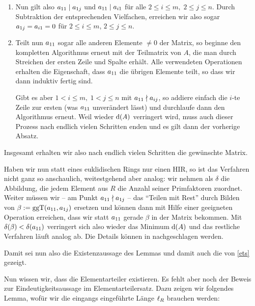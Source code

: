 \begin{proofsketch}
\begin{enumerate}[1.]
        \item
            Nun gilt also $a_{11} \mid a_{1j}$ und $a_{11} \mid a_{i1}$ für alle
            $2\leq i\leq m,\; 2\leq j\leq n$. Durch Subtraktion der entsprechenden
            Vielfachen, erreichen wir also sogar $a_{1j} = a_{i1} = 0$ für
            $2\leq i\leq m$, $2\leq j\leq n$.
            
        \item
            Teilt nun $a_{11}$ sogar alle anderen Elemente $\neq 0$ der Matrix, so
            beginne den kompletten Algorithmus erneut mit der Teilmatrix von
            $A$, die man durch Streichen der ersten Zeile und Spalte erhält.
            Alle verwendeten Operationen erhalten die Eigenschaft, dass $a_{11}$
            die übrigen Elemente teilt, so dass wir dann induktiv fertig sind.
            
            Gibt es aber $1<i\leq m,\; 1<j\leq n$ mit $a_{11} \nmid a_{ij}$, so
            addiere einfach die $i$-te Zeile zur ersten (was $a_{11}$ unverändert
            lässt) und durchlaufe dann den Algorithmus erneut. Weil wieder
            $\mathrm{d}(A)$ verringert wird, muss auch dieser Prozess nach endlich
            vielen Schritten enden und es gilt dann der vorherige Absatz.
    \end{enumerate}
    Insgesamt erhalten wir also nach endlich vielen Schritten die gewünschte
    Matrix.
    
    Haben wir nun statt eines euklidischen Rings nur einen HIR, so ist das
    Verfahren nicht ganz so anschaulich, weitestgehend aber analog: wir nehmen
    als $\delta$ die Abbildung, die jedem Element aus $R$ die Anzahl seiner
    Primfaktoren zuordnet. Weiter müssen wir -- am Punkt $a_{11} \nmid a_{1j}$ --
    das \enquote{Teilen mit Rest} durch Bilden von 
    $\beta := \mathrm{ggT}(a_{11},a_{1j})$ ersetzen und können dann mit Hilfe einer
    geeigneten Operation erreichen, dass wir statt $a_{11}$ gerade $\beta$ in
    der Matrix bekommen. Mit $\delta(\beta) < \delta(a_{11})$ verringert sich also
    wieder das Minimum $\mathrm{d}(A)$ und das restliche Verfahren läuft analog ab. Die
    Details können in \cite[S.\,213\,f.]{bookc:bosch08} nachgeschlagen werden.
    
    Damit sei nun also die Existenzaussage des Lemmas und damit auch die von
    \cref{ets} gezeigt.
    \\
\end{proofsketch}

Nun wissen wir, dass die Elementarteiler existieren. Es fehlt aber noch der
Beweis zur Eindeutigkeitsaussage im Elementarteilersatz. Dazu zeigen wir
folgendes Lemma, wofür wir die eingangs eingeführte Länge $\operatorname{\ell}_{R}$ brauchen
werden:

